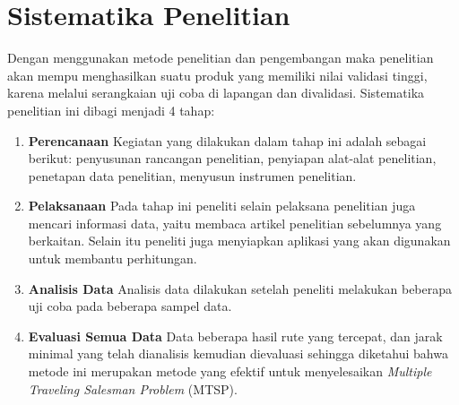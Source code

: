 \section{Sistematika Penelitian}

Dengan menggunakan metode penelitian dan pengembangan maka penelitian akan mempu menghasilkan suatu produk yang memiliki nilai validasi tinggi, karena melalui serangkaian uji coba di lapangan dan divalidasi. Sistematika penelitian ini dibagi menjadi 4 tahap:

\begin{enumerate}

	\item \textbf{Perencanaan}
	Kegiatan yang dilakukan dalam tahap ini adalah sebagai berikut: penyusunan rancangan penelitian, penyiapan alat-alat penelitian, penetapan data penelitian, menyusun instrumen penelitian.
	
	\item \textbf{Pelaksanaan}
	Pada tahap ini peneliti selain pelaksana penelitian  juga mencari informasi data, yaitu membaca artikel penelitian sebelumnya yang berkaitan. Selain itu peneliti juga menyiapkan aplikasi yang akan digunakan untuk membantu perhitungan.
	
	\item \textbf{Analisis Data}
	Analisis data dilakukan setelah peneliti melakukan beberapa uji coba pada beberapa sampel data.
	
	\item \textbf{Evaluasi Semua Data}
	Data beberapa hasil rute yang tercepat, dan jarak minimal yang telah dianalisis kemudian dievaluasi sehingga diketahui bahwa metode ini merupakan metode yang efektif untuk menyelesaikan \textit{Multiple Traveling Salesman Problem} (MTSP).

\end{enumerate}